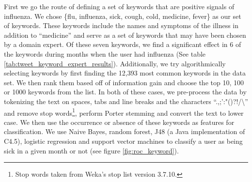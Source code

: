 \documentclass{acm_proc_article-sp}
\begin{document}
First we go the route of defining a set of keywords that are positive signals of influenza. We chose \{flu, influenza, sick, cough, cold, medicine, fever\} as our set of keywords. These keywords include the names and symptoms of the illness in addition to ``medicine'' and serve as a set of keywords that may have been chosen by a domain expert. Of these seven keywords, we find a significant effect in 6 of the keywords during months when the user had influenza (See table \ref{tab:tweet_keyword_expert_results}). Additionally, we try algorithmically selecting keywords by first finding the 12,393 most common keywords in the data set.  We then rank them based off of information gain and choose the top 10, 100 or 1000 keywords from the list. In both of these cases, we pre-process the data by tokenizing the text on spaces, tabs and line breaks and the characters ``.,;':"()?!/\textbackslash '' and remove stop words\footnote{Stop words taken from Weka's stop list version 3.7.10.}, perform Porter stemming \cite{Porter:1980dd,Willett:2006vb}  and convert the text to lower case. We then use the occurrence or absence of these keywords as features for classification. We use Naive Bayes, random forest, J48 (a Java implementation of C4.5), logistic regression and support vector machines to classify a user as being sick in a given month or not (see figure \ref{fig:roc_keyword}).
\end{document}
